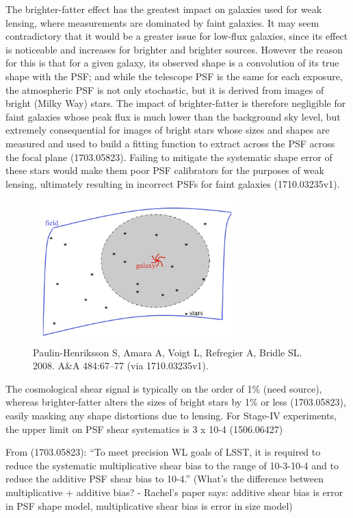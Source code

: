 The brighter-fatter effect has the greatest impact on galaxies used for weak lensing, where measurements are dominated by faint galaxies. It may seem contradictory that it would be a greater issue for low-flux galaxies, since its effect is noticeable and increases for brighter and brighter sources. However the reason for this is that for a given galaxy, its observed shape is a convolution of its true shape with the PSF; and while the telescope PSF is the same for each exposure, the atmospheric PSF is not only stochastic, but it is derived from images of bright (Milky Way) stars. The impact of brighter-fatter is therefore negligible for faint galaxies whose peak flux is much lower than the background sky level, but extremely consequential for images of bright stars whose sizes and shapes are measured and used to build a fitting function to extract across the PSF across the focal plane (1703.05823). Failing to mitigate the systematic shape error of these stars would make them poor PSF calibrators for the purposes of weak lensing, ultimately resulting in incorrect PSFs for faint galaxies (1710.03235v1). 

\begin{figure}
\centering
\includegraphics[width=8cm]{images/sensors/psf_interp.jpg}
\caption{Paulin-Henriksson S, Amara A, Voigt L, Refregier A, Bridle SL. 2008. A&A 484:67–77 (via 1710.03235v1).}
\label{fig:skymodel1}
\end{figure}

The cosmological shear signal is typically on the order of 1\% (need source), whereas brighter-fatter alters the sizes of bright stars by 1\% or less (1703.05823), easily masking any shape distortions due to lensing. For Stage-IV experiments, the upper limit on PSF shear systematics is 3 x 10-4 (1506.06427)

From (1703.05823): ``To meet precision WL goals of LSST, it is required to reduce the systematic multiplicative shear bias to the range of 10-3-10-4 and to reduce the additive PSF shear bias to 10-4.'' (What's the difference between multiplicative + additive bias? - Rachel's paper says: additive shear bias is error in PSF shape model, multiplicative shear bias is error in size model)

